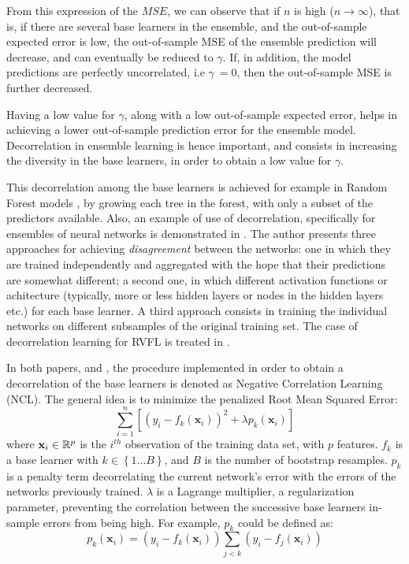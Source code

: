 From this expression of the $MSE$, we can observe that if $n$ is high ($n \rightarrow \infty$), that is, if there are several base learners in the ensemble, and the out-of-sample expected error is low, the out-of-sample MSE of the ensemble prediction will decrease, and can eventually be reduced to $\gamma$. If, in addition, the model predictions are perfectly uncorrelated, i.e $\gamma ~= 0$, then the out-of-sample MSE is further decreased.

\medskip

Having a low value for $\gamma$, along with a low out-of-sample expected error, helps in achieving a lower out-of-sample prediction error for the ensemble model. Decorrelation in ensemble learning is hence important, and consists in increasing the diversity in the base learners, in order to obtain a low value for $\gamma$.

\medskip

This decorrelation among the base learners is achieved for example in Random Forest models \cite{breiman2001random}, by growing each tree in the forest, with only a subset of the predictors available. Also, an example of use of decorrelation, specifically for ensembles of neural networks is demonstrated in \cite{rosen1996ensemble}. The author presents three approaches for achieving \textit{disagreement} between the networks: one in which they are trained independently and aggregated with the hope that their predictions are somewhat different; a second one, in which different activation functions or achitecture (typically, more or less hidden layers or nodes in the hidden layers etc.) for each base learner. A third approach consists in training the individual networks on different subsamples of the original training set. The case of decorrelation learning for RVFL is treated in \cite{alhamdoosh2014fast}.

\medskip

In both papers, \cite{rosen1996ensemble} and \cite{alhamdoosh2014fast}, the procedure implemented in order to obtain a decorrelation of the base learners is denoted as Negative Correlation Learning (NCL). The general idea is to minimize the penalized Root Mean Squared Error:
$$
\sum_{i = 1}^n\left[\left(y_i - f_k(\textbf{x}_i)\right)^2 + \lambda p_k(\textbf{x}_i)\right]
$$
where $\textbf{x}_i \in \mathbb{R}^p$ is the $i^{th}$ observation of the training data set, with $p$ features. $f_k$ is a base learner with $k \in \left \lbrace 1 \ldots B\right \rbrace$, and $B$ is the number of bootstrap resamples. $p_k$ is a penalty term decorrelating the current network's error with the errors of the networks previously trained. $\lambda$ is a Lagrange multiplier, a regularization parameter, preventing the correlation between the successive base learners in-sample errors from being high. For example, $p_k$ could be defined as:
$$
p_k(\textbf{x}_i) = \left(y_i - f_k(\textbf{x}_i)\right)\sum_{j < k}\left(y_i - f_j(\textbf{x}_i)\right)
$$

